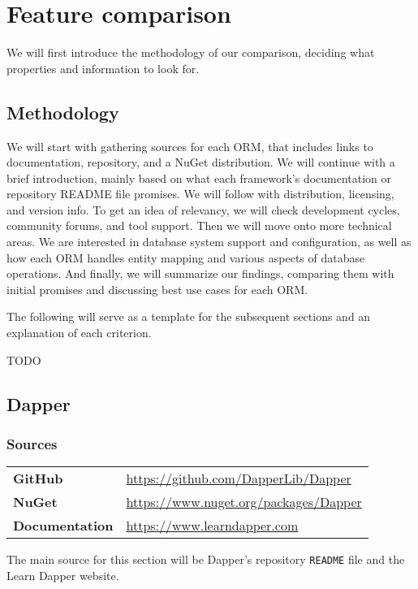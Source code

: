 \section{Feature comparison}
We will first introduce the methodology of our comparison, deciding what properties and information to look for.

\subsection{Methodology}

We will start with gathering sources for each ORM, that includes links to documentation, repository, and a NuGet distribution. We will continue with a brief introduction, mainly based on what each framework's documentation or repository README file promises. We will follow with distribution, licensing, and version info. To get an idea of relevancy, we will check development cycles, community forums, and tool support. Then we will move onto more technical areas. We are interested in database system support and configuration, as well as how each ORM handles entity mapping and various aspects of database operations. And finally, we will summarize our findings, comparing them with initial promises and discussing best use cases for each ORM.

The following will serve as a template for the subsequent sections and an explanation of each criterion.

TODO

\subsection{Dapper}\label{sec:feat_dapper}
\subsubsection*{Sources}
\begin{tabular}{@{}ll}
\textbf{GitHub}   & \url{https://github.com/DapperLib/Dapper}    \\
\textbf{NuGet}         & \url{https://www.nuget.org/packages/Dapper}  \\
\textbf{Documentation} & \url{https://www.learndapper.com}  \\
\end{tabular}

The main source for this section will be Dapper's repository \texttt{README} file\cite{DapperRepo} and the Learn Dapper website\cite{Dapper}.

